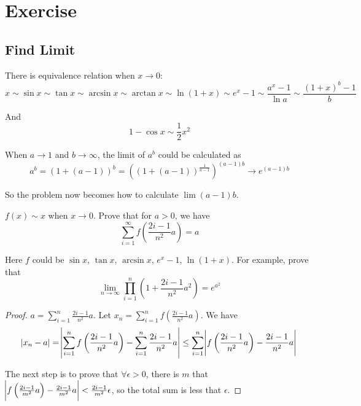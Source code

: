\chapter{Exercise}


\section{Find Limit}

\begin{theorem}
    There is equivalence relation when $x \rightarrow 0$:
    \begin{equation}
        x \sim \sin x \sim \tan x \sim \arcsin x \sim \arctan x \sim \ln (1+x) \sim e^x -1 \sim \frac{a^x - 1}{\ln a} \sim \frac{(1+x)^b -1}{b}
    \end{equation}
    
    And 
    \begin{equation}
        1 - \cos x \sim \frac{1}{2} x^2
    \end{equation}
\end{theorem}

\begin{example}
    When $a \rightarrow 1$ and $b \rightarrow \infty$, the limit of $a^b$ could be calculated as
    \begin{equation}
        a^b = (1 + (a-1))^b = \left(\left(1 + (a-1)\right)^{\frac{1}{a-1}}\right)^{(a-1)b} \rightarrow e^{(a-1)b}
    \end{equation}
    
    So the problem now becomes how to calculate $\lim (a-1)b$.
\end{example}


\begin{theorem}
    $f(x) \sim x$ when $x \rightarrow 0$. Prove that for $a > 0$, we have
    \begin{equation}
        \sum_{i=1}^\infty f\left ( \frac{2i-1}{n^2} a \right ) = a
    \end{equation}
    
    Here $f$ could be $\sin x$, $\tan x$, $\arcsin x$, $e^x -1$, $\ln (1+x)$. For example, prove that
    \begin{equation}
        \lim_{n \rightarrow \infty} \prod_{i=1}^n \left( 1 + \frac{2i-1}{n^2} a^2 \right) = e^{a^2}
    \end{equation}
\end{theorem}
\begin{proof}
    $a = \sum_{i=1}^n \frac{2i-1}{n^2} a$. Let $x_n = \sum_{i=1}^n f\left( \frac{2i-1}{n^2} a \right)$. We have
    \begin{equation*}
        \abs{x_n - a} = \abs{ \sum_{i=1}^n f\left( \frac{2i-1}{n^2} a \right) - \sum_{i=1}^n \frac{2i-1}{n^2} a} \leq \sum_{i=1}^n \abs{ f\left( \frac{2i-1}{n^2} a \right) - \frac{2i-1}{n^2} a}
    \end{equation*}
    
    The next step is to prove that $\forall \epsilon > 0$, there is $m$ that $\abs{ f\left( \frac{2i-1}{m^2} a \right) - \frac{2i-1}{m^2} a} < \frac{2i-1}{m^2} \epsilon$, so the total sum is less that $\epsilon$.
\end{proof}

